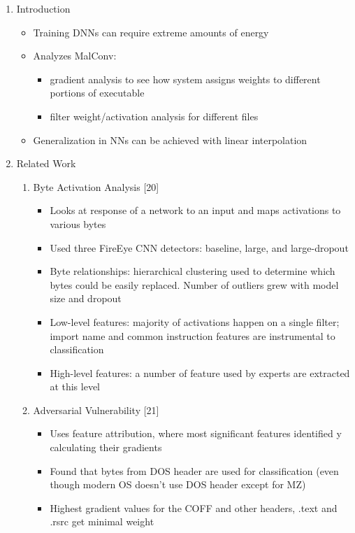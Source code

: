 \documentclass{article}
\begin{document}
\begin{enumerate}
	\item Introduction
	\begin{itemize}
		\item Training DNNs can require extreme amounts of energy
		\item Analyzes MalConv:
		\begin{itemize}
			\item gradient analysis to see how system assigns weights to different portions of executable
			\item filter weight/activation analysis for different files
		\end{itemize}
		\item Generalization in NNs can be achieved with linear interpolation
	\end{itemize}
	\item Related Work
	\begin{enumerate}
		\item Byte Activation Analysis [20]
		\begin{itemize}
			\item Looks at response of a network to an input and maps activations to various bytes
			\item Used three FireEye CNN detectors: baseline, large, and large-dropout
			\item Byte relationships: hierarchical clustering used to determine which bytes could be easily replaced. Number of outliers grew with model size and dropout
			\item Low-level features: majority of activations happen on a single filter; import name and common instruction features are instrumental to classification
			\item High-level features: a number of feature used by experts are extracted at this level
		\end{itemize}
		\item Adversarial Vulnerability [21]
		\begin{itemize}
			\item Uses feature attribution, where most significant features identified y calculating their gradients
			\item Found that bytes from DOS header are used for classification (even though modern OS doesn't use DOS header except for MZ)
			\item Highest gradient values for the COFF and other headers, .text and .rsrc get minimal weight
		\end{itemize}

\end{enumerate}
\end{enumerate}
\end{document}
